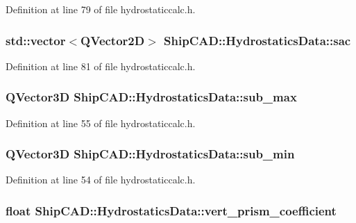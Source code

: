 Definition at line 79 of file hydrostaticcalc.\-h.

\hypertarget{structShipCAD_1_1HydrostaticsData_a503a1f2299db9d5ae923e598b8ee31ba}{
\subsubsection[{sac}]{\setlength{\rightskip}{0pt plus 5cm}std\-::vector$<$Q\-Vector2\-D$>$ Ship\-C\-A\-D\-::\-Hydrostatics\-Data\-::sac}}\label{structShipCAD_1_1HydrostaticsData_a503a1f2299db9d5ae923e598b8ee31ba}


Definition at line 81 of file hydrostaticcalc.\-h.

\hypertarget{structShipCAD_1_1HydrostaticsData_ab3a6e316a991426c74673025439f123c}{
\subsubsection[{sub\-\_\-max}]{\setlength{\rightskip}{0pt plus 5cm}Q\-Vector3\-D Ship\-C\-A\-D\-::\-Hydrostatics\-Data\-::sub\-\_\-max}}\label{structShipCAD_1_1HydrostaticsData_ab3a6e316a991426c74673025439f123c}


Definition at line 55 of file hydrostaticcalc.\-h.

\hypertarget{structShipCAD_1_1HydrostaticsData_a2d0a1e5f6bf98f8eceb958e5f7e7c73e}{
\subsubsection[{sub\-\_\-min}]{\setlength{\rightskip}{0pt plus 5cm}Q\-Vector3\-D Ship\-C\-A\-D\-::\-Hydrostatics\-Data\-::sub\-\_\-min}}\label{structShipCAD_1_1HydrostaticsData_a2d0a1e5f6bf98f8eceb958e5f7e7c73e}


Definition at line 54 of file hydrostaticcalc.\-h.

\hypertarget{structShipCAD_1_1HydrostaticsData_a2a7fc6a194bc1e78ecce8ab16512d1eb}{
\subsubsection[{vert\-\_\-prism\-\_\-coefficient}]{\setlength{\rightskip}{0pt plus 5cm}float Ship\-C\-A\-D\-::\-Hydrostatics\-Data\-::vert\-\_\-prism\-\_\-coefficient}}\label{structShipCAD_1_1HydrostaticsData_a2a7fc6a194bc1e78ecce8ab16512d1eb}


